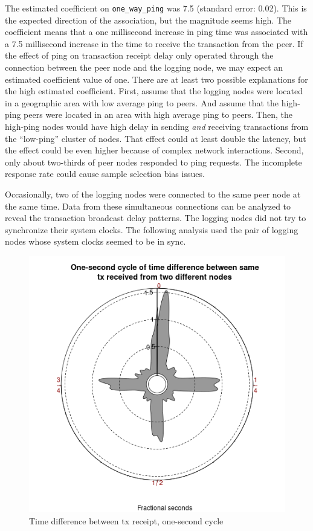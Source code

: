 \documentclass[usletter,11pt,english,openany]{article}
\begin{document}
The estimated coefficient on \texttt{one\_way\_ping} was 7.5 (standard
error: 0.02). This is the expected direction of the association, but
the magnitude seems high. The coefficient means that a one millisecond
increase in ping time was associated with a 7.5 millisecond increase
in the time to receive the transaction from the peer. If the effect
of ping on transaction receipt delay only operated through the connection
between the peer node and the logging node, we may expect an estimated
coefficient value of one. There are at least two possible explanations
for the high estimated coefficient. First, assume that the logging
nodes were located in a geographic area with low average ping to peers.
And assume that the high-ping peers were located in an area with high
average ping to peers. Then, the high-ping nodes would have high delay
in sending \textit{and} receiving transactions from the ``low-ping''
cluster of nodes. That effect could at least double the latency, but
the effect could be even higher because of complex network interactions.
Second, only about two-thirds of peer nodes responded to ping requests.
The incomplete response rate could cause sample selection bias issues.

Occasionally, two of the logging nodes were connected to the same
peer node at the same time. Data from these simultaneous connections
can be analyzed to reveal the transaction broadcast delay patterns.
The logging nodes did not try to synchronize their system clocks.
The following analysis used the pair of logging nodes whose system
clocks seemed to be in sync.

\begin{figure}[H]
\caption{Time difference between tx receipt, one-second cycle}
\label{fig-one-second-period-tx-p2p-msg}
\centering{}\includegraphics[scale=0.5]{images/one-second-period-tx-p2p-msg}
\end{figure}
\end{document}
